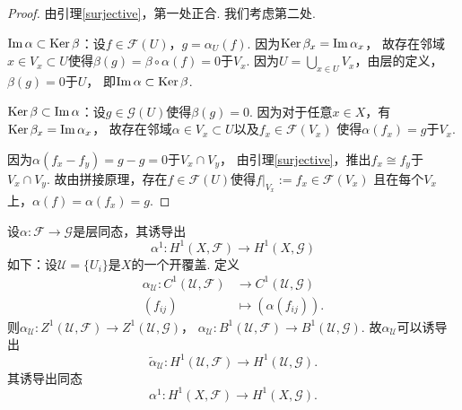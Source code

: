 \begin{proof}
	由引理\ref{surjective}，第一处正合. 我们考虑第二处.
				
	$\operatorname{Im}\alpha \subset \operatorname{Ker}\beta$：设$f\in \mathscr{F}(U)$，$g=\alpha_U(f)$. 
    因为$\operatorname{Ker}\beta_x=\operatorname{Im}\alpha_x$，
    故存在邻域$x\in V_x\subset U$使得$\beta(g)=\beta\circ \alpha(f)=0$于$V_x$. 
    因为$U=\bigcup\limits_{x\in U} V_x$，由层的定义，$\beta(g)=0$于$U$，
    即$\operatorname{Im}\alpha \subset \operatorname{Ker}\beta$.
	
	$\operatorname{Ker}\beta \subset \operatorname{Im}\alpha$：设$g\in \mathscr{G}(U)$使得$\beta(g)=0$. 
    因为对于任意$x\in X$，有$\operatorname{Ker}\beta_x=\operatorname{Im}\alpha_x$，
    故存在邻域$\alpha\in V_x\subset U$以及$f_x\in \mathscr{F}(V_x)$
    使得$\alpha(f_x)=g$于$V_x$.

	因为$\alpha(f_x-f_y)=g-g=0$于$V_x\cap V_y$，
    由引理\ref{surjective}，推出$f_x\cong f_y$于$V_x\cap V_y$. 
    故由拼接原理，存在$f\in \mathscr{F}(U)$使得$f|_{V_x}:=f_x\in \mathscr{F}(V_x)$
    且在每个$V_x$上，$\alpha(f)=\alpha(f_x)=g$.
\end{proof}

\begin{definition}
	设$\alpha\colon \mathscr{F}\rightarrow \mathscr{G}$是层同态，其诱导出
	$$\alpha^1\colon H^1(X,\mathscr{F})\rightarrow H^1(X,\mathscr{G})$$
	如下：设$\mathscr{U}=\{U_i\}$是$X$的一个开覆盖. 定义
	\begin{align*}
		\alpha_\mathscr{U}\colon C^1(\mathscr{U},\mathscr{F})&\rightarrow C^1(\mathscr{U},\mathscr{G})\\
		(f_{ij})&\mapsto (\alpha(f_{ij})).
	\end{align*}
	则$\alpha_\mathscr{U}\colon Z^1(\mathscr{U},\mathscr{F})\rightarrow Z^1(\mathscr{U},\mathscr{G})$，
    $\alpha_\mathscr{U}\colon B^1(\mathscr{U},\mathscr{F})\rightarrow B^1(\mathscr{U},\mathscr{G})$. 
    故$\alpha_\mathscr{U}$可以诱导出	
	$$\tilde{\alpha}_\mathscr{U}\colon H^1(\mathscr{U},\mathscr{F})
    \rightarrow H^1(\mathscr{U},\mathscr{G}).$$
	其诱导出同态
	$$\alpha^1\colon H^1(X,\mathscr{F})\rightarrow H^1(X,\mathscr{G}).$$
\end{definition}
		
